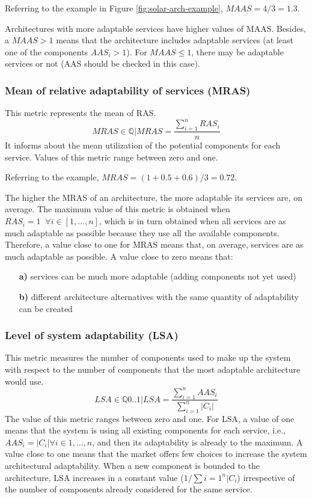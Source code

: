 \noindent Referring to the example in Figure \ref{fig:solar-arch-example}, $MAAS = 4/3 = 1.3$. 

Architectures with more adaptable services have higher values of MAAS. Besides, a $MAAS > 1$ means that the architecture includes adaptable services (at least one of the components $AAS_i > 1$). For $MAAS \le 1$, there may be adaptable services or not (AAS should be checked in this case).

\subsubsection{Mean of relative adaptability of services (MRAS)}
This metric represents the mean of RAS.
\[ MRAS \in \mathbb{Q} | MRAS = \frac{\sum_{i=1}^{n}RAS_i}{n}\]
It informs about the mean utilization of the potential components for each service. Values of this metric range between zero and one.

\noindent Referring to the example, $MRAS = (1 + 0.5 + 0.6)/3 = 0.72$.

The higher the MRAS of an architecture, the more adaptable its services are, on average. The maximum value of this metric is obtained when $RAS_i = 1 \;\;\forall i \in [1, \dots, n]$, which is in turn obtained when all services are as much adaptable as possible because they use all the available components. Therefore, a value close to one for MRAS means that, on average, services are as much adaptable as possible. A value close to zero means that: 
\begin{enumerate}
	\item[\textbf{a)}] services can be much more adaptable (adding components not yet used)
	\item[\textbf{b)}] different architecture alternatives with the same quantity of adaptability can be created
\end{enumerate}

\subsubsection{Level of system adaptability (LSA)}
This metric measures the number of components used to make up the system with respect to the number of components that the most adaptable architecture would use.
\[ LSA \in \mathbb{Q}{0..1} | LSA = \frac{\sum_{i=1}^{n}AAS_i}{\sum_{i=1}^{n}|C_i|} \]
The value of this metric ranges between zero and one. For LSA, a value of one means that the system is using all existing components for each service, i.e., $AAS_i = |C_i | \forall i \in {1,\dots, n}$, and then its adaptability is already to the maximum. A value close to one means that the market offers few choices to increase the system architectural adaptability. When a new component is bounded to the architecture, LSA increases in a constant value ($1/\sum{{i=1}^{n}|C_i}$) irrespective of the number of components already considered for the same service.

